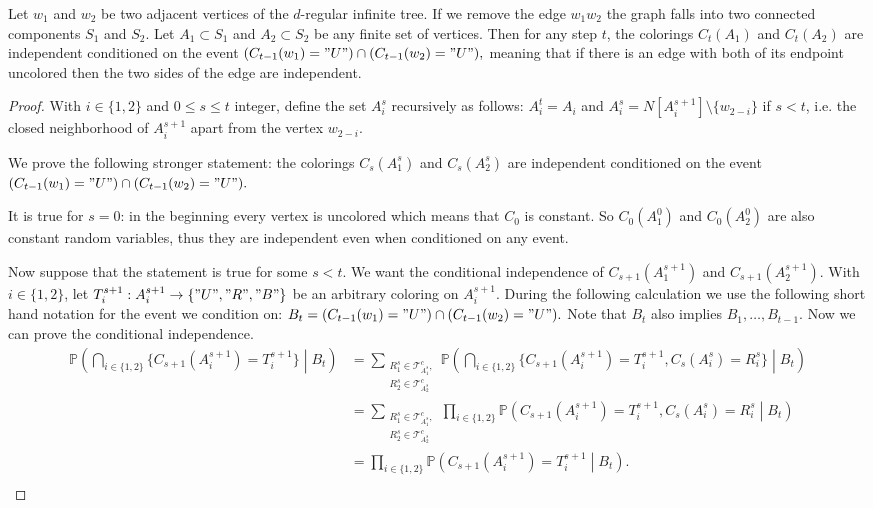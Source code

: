 \documentclass[10pt,a4paper]{amsart}
\newcommand{\bbP}{\mathbb P}
\begin{document}
\begin{lemma}
\label{lemma:condindep}
 Let $w_1$ and $w_2$ be two adjacent vertices of the $d$-regular infinite tree. If we remove the edge $w_1w_2$ the graph falls into two connected components $S_1$ and $S_2$. Let $A_1\subset S_1$ and $A_2\subset S_2$ be any finite set of vertices. Then for any step $t$, the colorings $C_t(A_1)$ and $C_t(A_2)$ are independent conditioned on the event $(C_{t-1}(w_1)="U")\cap(C_{t-1}(w_2)="U"),$ meaning that if there is an edge with both of its endpoint uncolored then the two sides of the edge are independent.
\end{lemma}

\begin{proof}
 With $i\in\{1,2\}$ and $0\leq s\leq t$ integer, define the set $A_i^s$ recursively as follows: $A_i^t=A_i$ and $A_i^s=N[A_i^{s+1}]\setminus\{w_{2-i}\}$ if $s<t$, i.e. the closed neighborhood of $A^{s+1}_i$ apart from the vertex $w_{2-i}$.

We prove the following stronger statement: the colorings $C_s(A_1^s)$ and $C_s(A_2^s)$ are independent conditioned on the event $(C_{t-1}(w_1)="U")\cap(C_{t-1}(w_2)="U").$
    
 It is true for $s=0$: in the beginning every vertex is uncolored which means that $C_0$ is constant. So $C_0(A_1^0)$ and $C_0(A_2^0)$ are also constant random variables, thus they are independent even when conditioned on any event.
    
 Now suppose that the statement is true for some $s<t$. We want the conditional independence of $C_{s+1}(A_1^{s+1})$ and $C_{s+1}(A_2^{s+1})$. With $i\in\{1,2\}$, let $T_i^{s+1}:A_i^{s+1}\to\{"U","R","B"\}$ be an arbitrary coloring on $A_i^{s+1}$. During the following calculation we use the following short hand notation for the event we condition on: $B_t=(C_{t-1}(w_1)="U")\cap(C_{t-1}(w_2)="U").$ Note that $B_t$ also implies $B_1,\dots,B_{t-1}.$ Now we can prove the conditional independence.
\begin{equation*}
\begin{split}
 \bbP\left(\bigcap_{i\in\{1,2\}}\{C_{s+1}(A_i^{s+1})=T_i^{s+1}\}\middle|B_t\right)&=\sum_{\substack{R^s_1\in\mathcal T^c_{A_1^s},\\R^s_2\in\mathcal T^c_{A_2^s}}}\bbP\left(\bigcap_{i\in\{1,2\}}\{C_{s+1}(A_i^{s+1})=T_i^{s+1},C_s(A_i^s)=R_i^s\}\middle| B_t\right)\\
 &=\sum_{\substack{R^s_1\in\mathcal T^c_{A_1^s},\\R^s_2\in\mathcal T^c_{A_2^s}}}\prod_{i\in\{1,2\}} \bbP\left(C_{s+1}(A_i^{s+1})=T_i^{s+1},C_s(A_i^s)=R_i^s\middle| B_t\right)\\
 &=\prod_{i\in\{1,2\}} \bbP\left(C_{s+1}(A_i^{s+1})=T_i^{s+1}\middle| B_t\right).\\
\end{split}
\end{equation*}


\end{proof}
\end{document}
